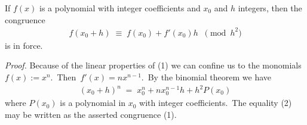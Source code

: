 \documentclass[12pt]{article}
\begin{document}
If $f(x)$ is a polynomial with integer coefficients and $x_0$ and $h$ integers, then the congruence
\begin{align}
f(x_0\!+\!h) \;\equiv\; f(x_0)+f'(x_0)h \;\; \pmod{h^2}
\end{align}
is in force.


{\it Proof.}\; Because of the linear properties of (1) we can confine us to the monomials\, $f(x) := x^n$.\, Then\, $f'(x) = nx^{n-1}$.\,  By the binomial theorem we have
\begin{align}
(x_0\!+\!h)^n \;=\; x_0^n\!+\!nx_0^{n-1}h+h^2P(x_0)
\end{align}
where $P(x_0)$ is a polynomial in $x_0$ with integer coefficients.\, The equality (2) may be written as the asserted congruence (1).
\end{document}
